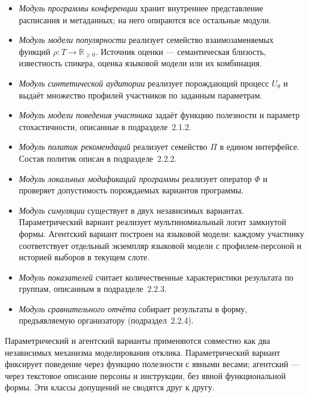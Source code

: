 \begin{itemize}
\item \textit{Модуль программы конференции} хранит внутреннее представление расписания и метаданных; на него опираются все остальные модули.

\item \textit{Модуль модели популярности} реализует семейство взаимозаменяемых функций $\rho: T \to \mathbb{R}_{\geq 0}$. Источник оценки --- семантическая близость, известность спикера, оценка языковой модели или их комбинация.

\item \textit{Модуль синтетической аудитории} реализует порождающий процесс $U_\theta$ и выдаёт множество профилей участников по заданным параметрам.

\item \textit{Модуль модели поведения участника} задаёт функцию полезности и параметр стохастичности, описанные в подразделе~2.1.2.

\item \textit{Модуль политик рекомендаций} реализует семейство $\Pi$ в едином интерфейсе. Состав политик описан в подразделе~2.2.2.

\item \textit{Модуль локальных модификаций программы} реализует оператор $\Phi$ и проверяет допустимость порождаемых вариантов программы.

\item \textit{Модуль симуляции} существует в двух независимых вариантах. Параметрический вариант реализует мультиномиальный логит замкнутой формы. Агентский вариант построен на языковой модели: каждому участнику соответствует отдельный экземпляр языковой модели с профилем-персоной и историей выборов в текущем слоте.

\item \textit{Модуль показателей} считает количественные характеристики результата по группам, описанным в подразделе~2.2.3.

\item \textit{Модуль сравнительного отчёта} собирает результаты в форму, предъявляемую организатору (подраздел~2.2.4).
\end{itemize}

Параметрический и агентский варианты применяются совместно как два независимых механизма моделирования отклика. Параметрический вариант фиксирует поведение через функцию полезности с явными весами; агентский --- через текстовое описание персоны и инструкции, без явной функциональной формы. Эти классы допущений не сводятся друг к другу.

